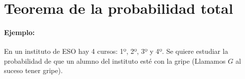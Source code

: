 \section{Teorema de la probabilidad total}
\paragraph{Ejemplo:} En un instituto de ESO hay 4 cursos: 1º, 2º, 3º y 4º. Se quiere estudiar la probabilidad de que un alumno del instituto esté con la gripe (Llamamos $G$ al suceso tener gripe). 

%
%
%    
%    
%    
%
%
%
%
%
%
%
%
%
%

